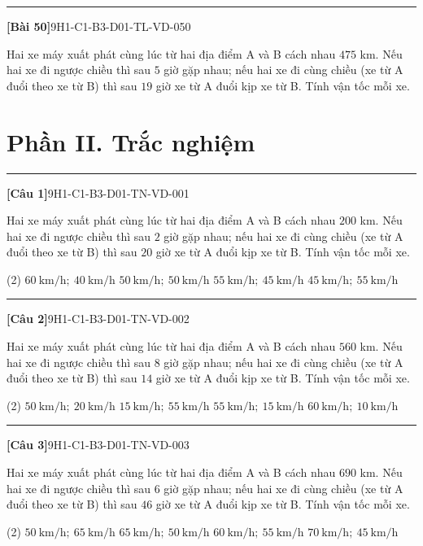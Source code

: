 \documentclass[12pt,a4paper]{article}
\newif\ifloigiai
\newenvironment{cauhoi}[2]{%
  \par\medskip\noindent\rule{\textwidth}{0.4pt}\par\nopagebreak
  \noindent\textbf{[#1]}\hfill{\scriptsize\ttfamily #2}\par\nopagebreak\smallskip}{\par}
\newcommand{\loigiai}[1]{\ifloigiai\par\smallskip\noindent\textit{Lời giải.} #1\par\fi}
\newcommand{\dapan}[1]{\ifloigiai\par\smallskip\noindent\textit{Đáp án:} \textbf{#1}\par\fi}
\begin{document}
\begin{cauhoi}{Bài 50}{9H1-C1-B3-D01-TL-VD-050}
Hai xe máy xuất phát cùng lúc từ hai địa điểm A và B cách nhau $475$ km. Nếu hai xe đi ngược chiều thì sau $5$ giờ gặp nhau; nếu hai xe đi cùng chiều (xe từ A đuổi theo xe từ B) thì sau $19$ giờ xe từ A đuổi kịp xe từ B. Tính vận tốc mỗi xe.
\loigiai{Gọi vận tốc xe từ A là $x$ (km/h) và xe từ B là $y$ (km/h), $x>y>0$. Đi ngược chiều: $5(x+y)=475$, tức là $x+y=95$. Đi cùng chiều: $19(x-y)=475$, tức là $x-y=25$. Giải hệ ta được $x=60$, $y=35$ (thoả mãn). Vậy vận tốc xe từ A là 60 km/h, xe từ B là 35 km/h.}
\end{cauhoi}
\clearpage\section*{Phần II. Trắc nghiệm}
\begin{cauhoi}{Câu 1}{9H1-C1-B3-D01-TN-VD-001}
Hai xe máy xuất phát cùng lúc từ hai địa điểm A và B cách nhau $200$ km. Nếu hai xe đi ngược chiều thì sau $2$ giờ gặp nhau; nếu hai xe đi cùng chiều (xe từ A đuổi theo xe từ B) thì sau $20$ giờ xe từ A đuổi kịp xe từ B. Tính vận tốc mỗi xe.
\begin{tasks}(2)
\task $60\ \text{km/h};\ 40\ \text{km/h}$
\task $50\ \text{km/h};\ 50\ \text{km/h}$
\task $55\ \text{km/h};\ 45\ \text{km/h}$
\task $45\ \text{km/h};\ 55\ \text{km/h}$
\end{tasks}
\dapan{C}
\end{cauhoi}
\begin{cauhoi}{Câu 2}{9H1-C1-B3-D01-TN-VD-002}
Hai xe máy xuất phát cùng lúc từ hai địa điểm A và B cách nhau $560$ km. Nếu hai xe đi ngược chiều thì sau $8$ giờ gặp nhau; nếu hai xe đi cùng chiều (xe từ A đuổi theo xe từ B) thì sau $14$ giờ xe từ A đuổi kịp xe từ B. Tính vận tốc mỗi xe.
\begin{tasks}(2)
\task $50\ \text{km/h};\ 20\ \text{km/h}$
\task $15\ \text{km/h};\ 55\ \text{km/h}$
\task $55\ \text{km/h};\ 15\ \text{km/h}$
\task $60\ \text{km/h};\ 10\ \text{km/h}$
\end{tasks}
\dapan{C}
\end{cauhoi}
\begin{cauhoi}{Câu 3}{9H1-C1-B3-D01-TN-VD-003}
Hai xe máy xuất phát cùng lúc từ hai địa điểm A và B cách nhau $690$ km. Nếu hai xe đi ngược chiều thì sau $6$ giờ gặp nhau; nếu hai xe đi cùng chiều (xe từ A đuổi theo xe từ B) thì sau $46$ giờ xe từ A đuổi kịp xe từ B. Tính vận tốc mỗi xe.
\begin{tasks}(2)
\task $50\ \text{km/h};\ 65\ \text{km/h}$
\task $65\ \text{km/h};\ 50\ \text{km/h}$
\task $60\ \text{km/h};\ 55\ \text{km/h}$
\task $70\ \text{km/h};\ 45\ \text{km/h}$
\end{tasks}
\dapan{B}
\end{cauhoi}
\end{document}
